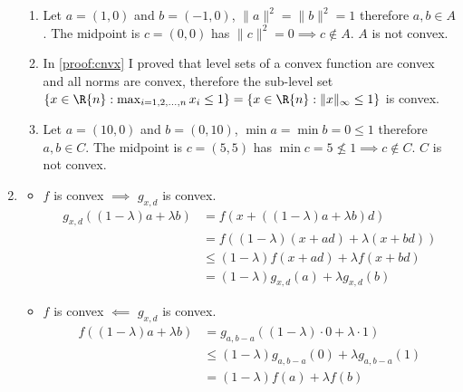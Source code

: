 \documentclass{article}
\begin{document}
\begin{tasks}
\begin{enumerate}[label={\color{tcum}P \Roman{week}.\arabic*}]
\begin{enumerate}[label={\color{tcum}\arabic*.}]
                    \item Let \(a = (1, 0)\) and \(b = (-1, 0)\), \(\|a\|^2 = \|b\|^2 = 1\) therefore \(a, b \in A\). The midpoint is \(c = (0, 0)\) has \(\|c\|^2 = 0 \implies c \not \in A\). \(A\) is not convex.
                    \item In \ref{proof:cnvx} I proved that level sets of a convex function are convex and all norms are convex, therefore the sub-level set \(\{x\in\R{n}:\max_{i=1,2,\dots,n}x_i\le1\} = \{x\in\R{n}:\|x\|_{\infty}\le1\}\) is convex.
                    \item Let \(a = (10, 0)\) and \(b = (0, 10)\), \(\min a = \min b = 0 \le 1\) therefore \(a, b \in C\). The midpoint is \(c = (5, 5)\) has \(\min c = 5 \not\le 1 \implies c \not \in C\). \(C\) is not convex.
                \end{enumerate}
            \item \begin{itemize}
                    \item \(f\) is convex \(\implies\) \(g_{x,d}\) is convex.
                    \begin{displaymath}
                        \begin{aligned}
                            g_{x,d}((1-\lambda)a+\lambda b)
                            &= f(x+((1-\lambda)a+\lambda b)d) \\
                            &= f((1-\lambda)(x+ad)+\lambda(x+bd)) \\
                            &\le (1-\lambda)f(x+ad)+\lambda f(x+bd) \\
                            &= (1-\lambda)g_{x,d}(a) + \lambda g_{x,d}(b)
                        \end{aligned}
                    \end{displaymath}

                    \item \(f\) is convex \(\impliedby\) \(g_{x,d}\) is convex.
                    \begin{displaymath}
                        \begin{aligned}
                            f((1-\lambda)a+\lambda b) 
                            &= g_{a,b-a}((1-\lambda)\cdot0 + \lambda\cdot1) \\
                            &\le (1-\lambda)g_{a,b-a}(0) + \lambda g_{a,b-a}(1) \\
                            &= (1-\lambda)f(a) + \lambda f(b)
                        \end{aligned}
                    \end{displaymath}
                \end{itemize}
        \end{enumerate}
    \end{tasks}
\end{document}
